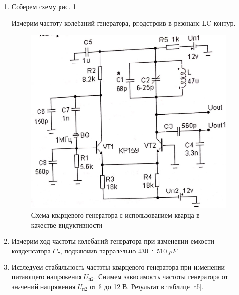 \documentclass[a4paper]{article}
\begin{document}
\begin{enumerate}
    \item Соберем схему рис. \ref{scheme_3}
    
    Измерим частоту колебаний генератора, рподстроив в резонанс LC-контур. 
    \begin{center}
    \end{center}

    \begin{figure}[H]
        \begin{center}
            \includegraphics[scale = 0.2]{scheme_3.jpg}
            \caption{Схема кварцевого генератора с использованием кварца в качестве индуктивности}
            \label{scheme_3}
        \end{center}
    \end{figure}

    \item Измерим ход частоты колебаний генератора при изменении емкости конденсатора $C_7$, подключив парралельно $430 \div 510\; pF$.
    \begin{center}
    \end{center}
    \item Исследуем стабильность частоты кварцевого генератора при изменении питающего напряжения $U_{п2}$. Снимем зависимость частоты генератора от значений напряжения 
    $U_{п2}$ от 8 до 12 В. Результат в таблице \ref{t5}.


\end{enumerate}
\end{document}
